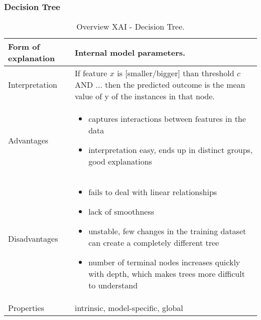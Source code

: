 \subsubsection{Decision Tree}
\begin{table}[H]
  \centering
  \begin{tabular}{|p{}|p{}|}
    \hline
    Form of \newline explanation & 
    Internal model parameters. \\
    
    \hline
    Interpretation & 
    If feature $x$ is [smaller/bigger] than threshold $c$ AND $\dots$ then the predicted outcome is the mean value of y of the instances in that node. \\
 
    \hline
    Advantages &
    \begin{itemize}[nosep, left=0em]
        \item captures interactions between features in the data
        \item interpretation easy, ends up in distinct groups, good explanations
    \end{itemize} \\
    
    \hline
    Disadvantages &
    \begin{itemize}[nosep, left=0em]
        \item fails to deal with linear relationships
        \item lack of smoothness
        \item unstable, few changes in the training dataset can create a completely different tree
        \item number of terminal nodes increases quickly with depth, which makes trees more difficult to understand
    \end{itemize} \\
    
    \hline
    Properties & 
    intrinsic, model-specific, global  \\
    
    \hline
  \end{tabular}
  \caption{Overview XAI - Decision Tree.}
  \label{tab:Tree}
\end{table}

